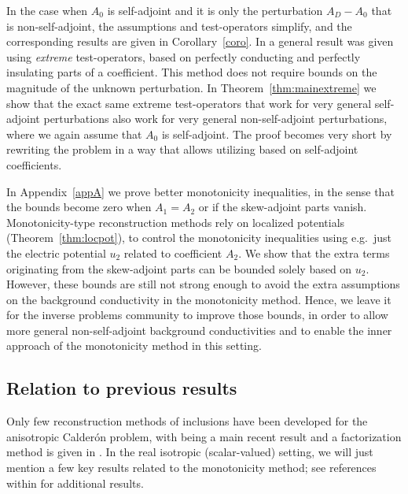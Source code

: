 \documentclass[reqno]{amsart}
\numberwithin{equation}{section}
\numberwithin{figure}{section}
\numberwithin{table}{section}
\theoremstyle{plain}
\theoremstyle{definition}
\theoremstyle{remark}
\begin{document}
	In the case when $A_0$ is self-adjoint and it is only the perturbation $A_D-A_0$ that is non-self-adjoint, the assumptions and test-operators simplify, and the corresponding results are given in Corollary~\ref{coro}. In \cite[theorem 12.2]{GJZ2025} a general result was given using \emph{extreme} test-operators, based on perfectly conducting and perfectly insulating parts of a coefficient. This method does not require bounds on the magnitude of the unknown perturbation. In Theorem~\ref{thm:mainextreme} we show that the exact same extreme test-operators that work for very general self-adjoint perturbations also work for very general non-self-adjoint perturbations, where we again assume that $A_0$ is self-adjoint. The proof becomes very short by rewriting the problem in a way that allows utilizing \cite[theorem~12.2]{GJZ2025} based on self-adjoint coefficients.
	
	In Appendix~\ref{appA} we prove better monotonicity inequalities, in the sense that the bounds become zero when $A_1 = A_2$ or if the skew-adjoint parts vanish. Monotonicity-type reconstruction methods rely on localized potentials (Theorem~\ref{thm:locpot}), to control the monotonicity inequalities using e.g.\ just the electric potential $u_2$ related to coefficient $A_2$. We show that the extra terms originating from the skew-adjoint parts can be bounded solely based on $u_2$. However, these bounds are still not strong enough to avoid the extra assumptions on the background conductivity in the monotonicity method. Hence, we leave it for the inverse problems community to improve those bounds, in order to allow more general non-self-adjoint background conductivities and to enable the inner approach of the monotonicity method in this setting.
	
	\subsection{Relation to previous results}
	
	Only few reconstruction methods of inclusions have been developed for the anisotropic Calder\'on problem, with \cite{GJZ2025} being a main recent result and a factorization method is given in \cite{Kirsch2005}. In the real isotropic (scalar-valued) setting, we will just mention a few key results \cite{GardeVogelius2024,Garde2020,Harrach13,Harrach10,Tamburrino2002} related to the monotonicity method; see references within \cite{GJZ2025,Harrach19} for additional results.
	
\end{document}

